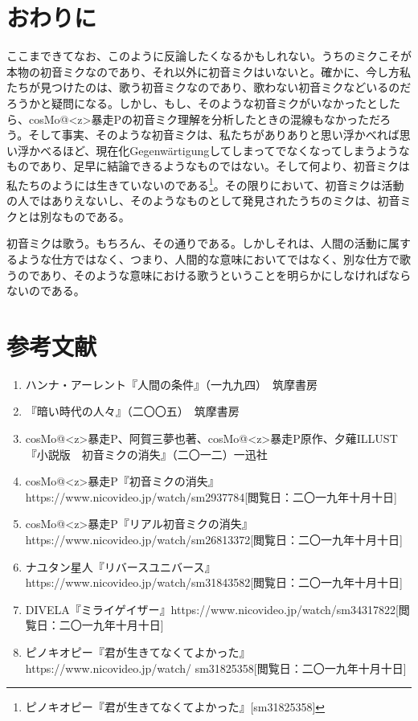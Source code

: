 \documentclass[b5j,twoside,twocolumn]{utarticle}
\begin{document}
\section*{おわりに}
ここまできてなお、このように反論したくなるかもしれない。うちのミクこそが本物の初音ミクなのであり、それ以外に初音ミクはいないと。確かに、今し方私たちが見つけたのは、歌う初音ミクなのであり、歌わない初音ミクなどいるのだろうかと疑問になる。しかし、もし、そのような初音ミクがいなかったとしたら、cosMo@\pbox<z>{暴走}Pの初音ミク理解を分析したときの混線もなかっただろう。そして事実、そのような初音ミクは、私たちがありありと思い浮かべれば思い浮かべるほど、現在化Gegenwärtigungしてしまってでなくなってしまうようなものであり、足早に結論できるようなものではない。そして何より、初音ミクは私たちのようには生きていないのである\footnote{ピノキオピー『君が生きてなくてよかった』[sm31825358]}。その限りにおいて、初音ミクは活動の人ではありえないし、そのようなものとして発見されたうちのミクは、初音ミクとは別なものである。


初音ミクは歌う。もちろん、その通りである。しかしそれは、人間の活動に属するような仕方ではなく、つまり、人間的な意味においてではなく、別な仕方で歌うのであり、そのような意味における歌うということを明らかにしなければならないのである。

\section*{参考文献}
\small{
\renewcommand{\labelenumi}{\pbox<y>{[\arabic{enumi}]}}
\begin{enumerate}
\item ハンナ・アーレント『人間の条件』（一九九四）　筑摩書房
\item 『暗い時代の人々』（二〇〇五）　筑摩書房
\item cosMo@\pbox<z>{暴走}P、阿賀三夢也著、cosMo@\pbox<z>{暴走}P原作、夕薙ILLUST『小説版　初音ミクの消失』（二〇一二）一迅社
\item cosMo@\pbox<z>{暴走}P『初音ミクの消失』https://www.nicovideo.jp/watch/sm2937784[閲覧日：二〇一九年十月十日]
\item  cosMo@\pbox<z>{暴走}P『リアル初音ミクの消失』
https://www.nicovideo.jp/watch/sm26813372[閲覧日：二〇一九年十月十日]
\item ナユタン星人『リバースユニバース』\\https://www.nicovideo.jp/watch/sm31843582[閲覧日：二〇一九年十月十日]
\item DIVELA『ミライゲイザー』https://www.nicovideo.jp/watch/sm34317822[閲覧日：二〇一九年十月十日]
\item ピノキオピー『君が生きてなくてよかった』\\https://www.nicovideo.jp/watch/ sm31825358[閲覧日：二〇一九年十月十日]

\end{enumerate}
}
\end{document}
